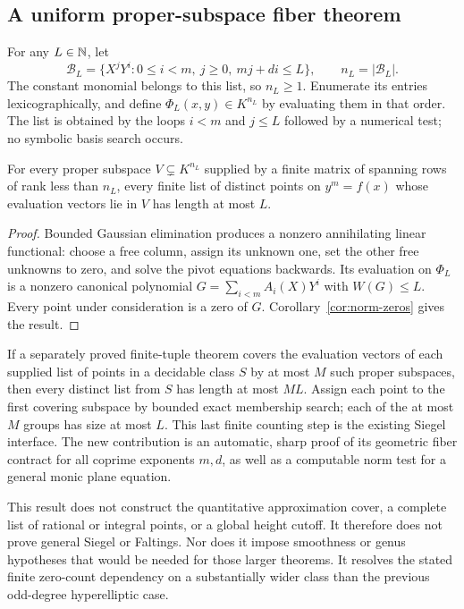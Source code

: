 \subsection{A uniform proper-subspace fiber theorem}

For any $L\in\mathbb N$, let
\[
 \mathcal B_L=\{X^jY^i:0\leq i<m,\ j\geq0,\ mj+di\leq L\},
 \qquad n_L=|\mathcal B_L|.
\]
The constant monomial belongs to this list, so $n_L\geq1$.
Enumerate its entries lexicographically, and define
$\Phi_L(x,y)\in K^{n_L}$ by evaluating them in that order.
The list is obtained by the loops $i<m$ and $j\leq L$ followed by
a numerical test; no symbolic basis search occurs.

\begin{corollary}
\label{cor:norm-subspace}
For every proper subspace $V\subsetneq K^{n_L}$ supplied by a
finite matrix of spanning rows of rank less than $n_L$, every
finite list of distinct points on $y^m=f(x)$ whose evaluation
vectors lie in $V$ has length at most $L$.
\end{corollary}
\begin{proof}
Bounded Gaussian elimination produces a nonzero annihilating
linear functional: choose a free column, assign its unknown one,
set the other free unknowns to zero, and solve the pivot equations
backwards. Its evaluation on $\Phi_L$ is a nonzero canonical
polynomial $G=\sum_{i<m}A_i(X)Y^i$ with $W(G)\leq L$.
Every point under consideration is a zero of $G$.
Corollary~\ref{cor:norm-zeros} gives the result.
\end{proof}

If a separately proved finite-tuple theorem covers the evaluation
vectors of each supplied list of points in a decidable class $S$
by at most $M$ such proper subspaces, then every distinct list
from $S$ has length at most $ML$. Assign each point to the first
covering subspace by bounded exact membership search; each of the
at most $M$ groups has size at most $L$. This last finite counting
step is the existing Siegel interface. The new contribution is an
automatic, sharp proof of its geometric fiber contract for all
coprime exponents $m,d$, as well as a computable norm test for a
general monic plane equation.

This result does not construct the quantitative approximation
cover, a complete list of rational or integral points, or a global
height cutoff. It therefore does not prove general Siegel or
Faltings. Nor does it impose smoothness or genus hypotheses that
would be needed for those larger theorems. It resolves the stated
finite zero-count dependency on a substantially wider class than
the previous odd-degree hyperelliptic case.

